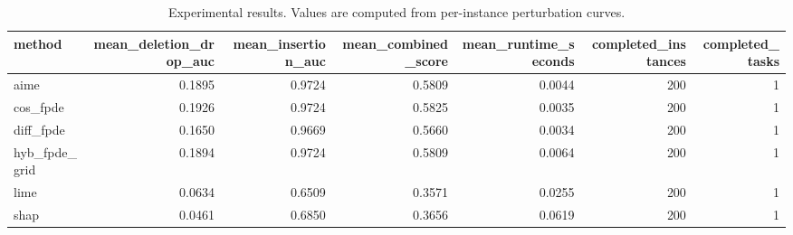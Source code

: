 \begin{table}[t]
\caption{Experimental results. Values are computed from per-instance perturbation curves.}
\label{tab:main_results_computed}
\centering
\begin{tabular}{lrrrrrr}
\toprule
method & mean\_deletion\_drop\_auc & mean\_insertion\_auc & mean\_combined\_score & mean\_runtime\_seconds & completed\_instances & completed\_tasks \\
\midrule
aime & 0.1895 & 0.9724 & 0.5809 & 0.0044 & 200 & 1 \\
cos\_fpde & 0.1926 & 0.9724 & 0.5825 & 0.0035 & 200 & 1 \\
diff\_fpde & 0.1650 & 0.9669 & 0.5660 & 0.0034 & 200 & 1 \\
hyb\_fpde\_grid & 0.1894 & 0.9724 & 0.5809 & 0.0064 & 200 & 1 \\
lime & 0.0634 & 0.6509 & 0.3571 & 0.0255 & 200 & 1 \\
shap & 0.0461 & 0.6850 & 0.3656 & 0.0619 & 200 & 1 \\
\bottomrule
\end{tabular}

\end{table}
